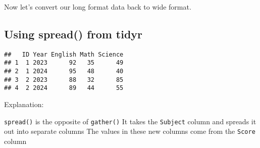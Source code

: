 \documentclass[
]{article}
\begin{document}
Now let's convert our long format data back to wide format.

\hypertarget{using-spread-from-tidyr}{%
\subsection{Using spread() from tidyr}\label{using-spread-from-tidyr}}

\begin{verbatim}
##   ID Year English Math Science
## 1  1 2023      92   35      49
## 2  1 2024      95   48      40
## 3  2 2023      88   32      85
## 4  2 2024      89   44      55
\end{verbatim}

Explanation:

\texttt{spread()} is the opposite of \texttt{gather()} It takes the
\texttt{Subject} column and spreads it out into separate columns The
values in these new columns come from the \texttt{Score} column
\end{document}

